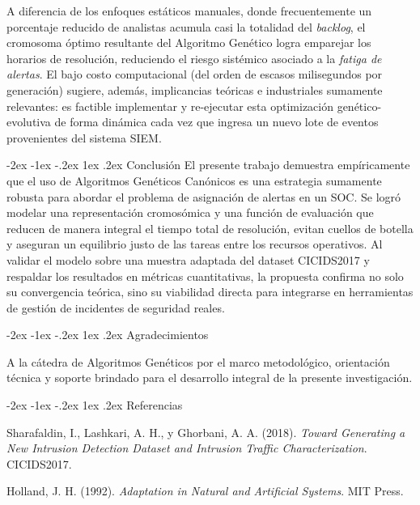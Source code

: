 \documentclass[12pt,a4paper,twocolumn]{article}
\makeatletter
\renewcommand{\section}{\@startsection{section}{1}{\z@}%
  {-2ex \@plus -1ex \@minus -.2ex}%
  {1ex \@plus.2ex}%
  {\fontsize{12}{14}\selectfont\bfseries}}
\makeatother
\begin{document}
A diferencia de los enfoques estáticos manuales, donde frecuentemente un porcentaje reducido de analistas acumula casi la totalidad del \textit{backlog}, el cromosoma óptimo resultante del Algoritmo Genético logra emparejar los horarios de resolución, reduciendo el riesgo sistémico asociado a la \textit{fatiga de alertas}. El bajo costo computacional (del orden de escasos milisegundos por generación) sugiere, además, implicancias teóricas e industriales sumamente relevantes: es factible implementar y re-ejecutar esta optimización genético-evolutiva de forma dinámica cada vez que ingresa un nuevo lote de eventos provenientes del sistema SIEM.

\section{Conclusión}
El presente trabajo demuestra empíricamente que el uso de Algoritmos Genéticos Canónicos es una estrategia sumamente robusta para abordar el problema de asignación de alertas en un SOC. Se logró modelar una representación cromosómica y una función de evaluación que reducen de manera integral el tiempo total de resolución, evitan cuellos de botella y aseguran un equilibrio justo de las tareas entre los recursos operativos. Al validar el modelo sobre una muestra adaptada del dataset CICIDS2017 y respaldar los resultados en métricas cuantitativas, la propuesta confirma no solo su convergencia teórica, sino su viabilidad directa para integrarse en herramientas de gestión de incidentes de seguridad reales.

\section{Agradecimientos}
{\fontsize{10}{12}\selectfont
A la cátedra de Algoritmos Genéticos por el marco metodológico, orientación técnica y soporte brindado para el desarrollo integral de la presente investigación.
\par}

\section{Referencias}
{\fontsize{10}{12}\selectfont
\noindent [1] Sharafaldin, I., Lashkari, A. H., y Ghorbani, A. A. (2018). \textit{Toward Generating a New Intrusion Detection Dataset and Intrusion Traffic Characterization}. CICIDS2017.

\noindent [2] Holland, J. H. (1992). \textit{Adaptation in Natural and Artificial Systems}. MIT Press.
\par}
\end{document}
